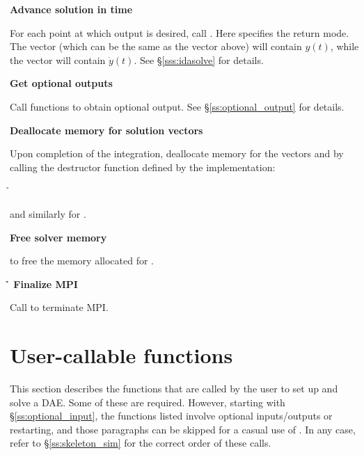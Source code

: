 \begin{Steps}
\item
  {\bf Advance solution in time}

  For each point at which output is desired, call
  .
  Here  specifies the return mode.  The vector 
  (which can be the same as the vector  above) will contain $y(t)$,
  while the vector  will contain $\dot{y}(t)$.
  See \S\ref{sss:idasolve} for details.
  
\item
  {\bf Get optional outputs}

  Call  functions to obtain optional output.
  See \S\ref{ss:optional_output} for details.

\item
  {\bf Deallocate memory for solution vectors}

  Upon completion of the integration, deallocate memory for the vectors 
  and  by calling the destructor function defined by the {\nvector} 
  implementation:

  {\s} 

  {\omp} 

  {\pt} 
  
  {\p} 

  {\h} 

  and similarly for .
  
\item
  {\bf Free solver memory}

   to free the memory allocated for {\idas}.
  
\item 
  {\bf {\p} {\h} Finalize MPI}
  
  Call  to terminate MPI.

\end{Steps}

\section{User-callable functions}\label{ss:callable_fct_sim}

This section describes the {\idas} functions that are called by the
user to set up and solve a DAE. Some of these are required. However,
starting with \S\ref{ss:optional_input}, the functions listed involve
optional inputs/outputs or restarting, and those paragraphs can be
skipped for a casual use of {\idas}. In any case, refer to
\S\ref{ss:skeleton_sim} for the correct order of these calls.

